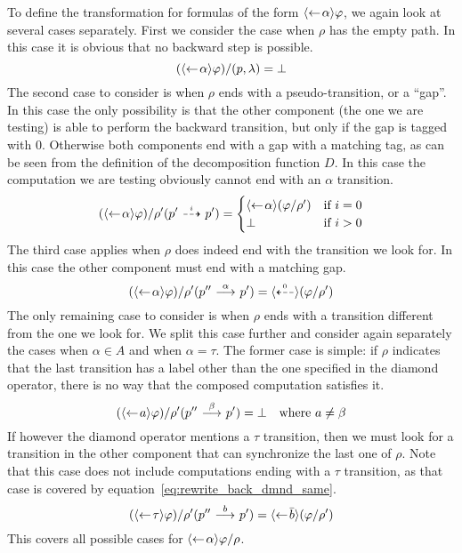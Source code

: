 To define the transformation for formulas of the form $\mbox{\ensuremath{\langle\leftarrow\! \alpha \rangle}}\varphi$, we
again look at several cases separately. First we consider the case when $\rho$ has
the empty path. In this case it is obvious that no backward step is possible.
\[
    (\mbox{\ensuremath{\langle\leftarrow\! \alpha \rangle}}\varphi) / (p,\lambda) = \bot
\]
The second case to consider is when $\rho$ ends with a pseudo-transition, or a ``gap''.
In this case the only possibility is that the other component (the one we are testing)
is able to perform the backward transition, but only if the gap is tagged with $0$.
Otherwise both components end with a gap with a matching tag, as can be seen from the
definition of the decomposition function $D$. In this case the computation we are testing
obviously cannot end with an $\alpha$ transition.
\[
    (\mbox{\ensuremath{\langle\leftarrow\! \alpha \rangle}}\varphi) / \rho'(p'\ {\stackrel{_{i}}{\dashrightarrow}}\  p') =
    \begin{cases}
        \mbox{\ensuremath{\langle\leftarrow\! \alpha \rangle}} (\varphi / \rho') & \textrm{if $i=0$} \\
        \bot & \textrm{if $i>0$} \\
    \end{cases}
\]
The third case applies when $\rho$ does indeed end with the transition we look for.
In this case the other component must end with a matching gap.
\begin{equation}\label{eq:rewrite_back_dmnd_same}
    (\mbox{\ensuremath{\langle\leftarrow\! \alpha \rangle}}\varphi) / \rho'(p''\ {\stackrel{{\alpha}}{\longrightarrow}}\  p') = \mbox{\ensuremath{\langle\stackrel{_{0}}{\dashleftarrow}\rangle}} (\varphi / \rho')
\end{equation}
The only remaining case to consider is when $\rho$ ends with a transition different from
the one we look for. We split this case further and consider
again separately the cases when $\alpha\in A$ and when $\alpha = \tau$. The former case
is simple: if $\rho$ indicates that the last transition has a label other than the one
specified
in the diamond operator, there is no way that the composed computation satisfies it.
\[
    (\mbox{\ensuremath{\langle\leftarrow\! a \rangle}}\varphi) / \rho'(p'' \ {\stackrel{{\beta}}{\longrightarrow}}\  p') = \bot \quad\textrm{where $a\ne \beta$}
\]
If however the diamond operator mentions a $\tau$ transition, then we must look for a
transition in the other component that can synchronize the last one of $\rho$. Note that this
case does not include computations ending with a $\tau$ transition, as that case is
covered by equation~\ref{eq:rewrite_back_dmnd_same}.
\[
    (\mbox{\ensuremath{\langle\leftarrow\! \tau \rangle}}\varphi) / \rho'(p'' \ {\stackrel{{b}}{\longrightarrow}}\  p') = \mbox{\ensuremath{\langle\leftarrow\! \bar{b} \rangle}} (\varphi/\rho')
\]
This covers all possible cases for $\mbox{\ensuremath{\langle\leftarrow\! \alpha \rangle}}\varphi / \rho$.

